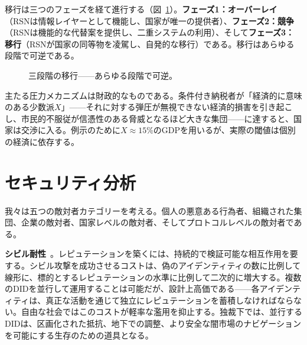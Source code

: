 \documentclass[11pt,a4paper,twocolumn]{article}
\begin{document}
移行は三つのフェーズを経て進行する（図~\ref{fig:migration}）。\textbf{フェーズ1：オーバーレイ}（RSNは情報レイヤーとして機能し、国家が唯一の提供者）、\textbf{フェーズ2：競争}（RSNは機能的な代替案を提供し、二重システムの利用）、そして\textbf{フェーズ3：移行}（RSNが国家の同等物を凌駕し、自発的な移行）である。移行はあらゆる段階で可逆である。

\begin{figure}[ht]
\centering
{}
\caption{三段階の移行——あらゆる段階で可逆。}
\label{fig:migration}
\end{figure}

主たる圧力メカニズムは財政的なものである。条件付き納税者が「経済的に意味のある少数派$X$」——それに対する弾圧が無視できない経済的損害を引き起こし、市民的不服従が信憑性のある脅威となるほど大きな集団——に達すると、国家は交渉に入る。例示のために$X \approx 15\%$のGDPを用いるが、実際の閾値は個別の経済に依存する。

\section{セキュリティ分析}

我々は五つの敵対者カテゴリーを考える。個人の悪意ある行為者、組織された集団、企業の敵対者、国家レベルの敵対者、そしてプロトコルレベルの敵対者である。

\textbf{シビル耐性}~\cite{douceur2002}。レピュテーションを築くには、持続的で検証可能な相互作用を要する。シビル攻撃を成功させるコストは、偽のアイデンティティの数に比例して線形に、標的とするレピュテーションの水準に比例して二次的に増大する。複数のDIDを並行して運用することは可能だが、設計上高価である——各アイデンティティは、真正な活動を通じて独立にレピュテーションを蓄積しなければならない。自由な社会ではこのコストが軽率な濫用を抑止する。独裁下では、並行するDIDは、区画化された抵抗、地下での調整、より安全な闇市場のナビゲーションを可能にする生存のための道具となる。
\end{document}
